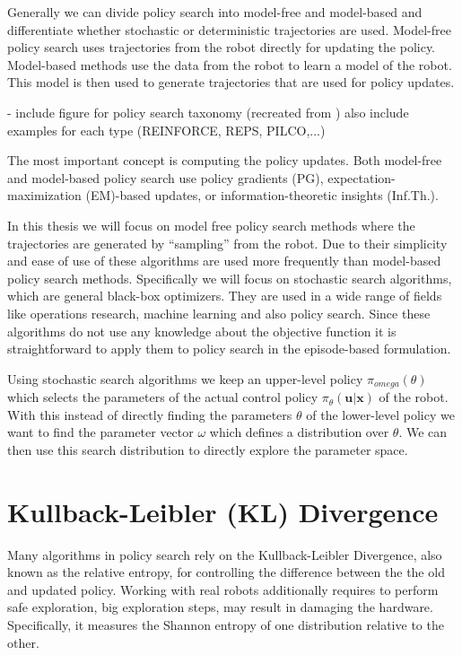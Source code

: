 Generally we can divide policy search into model-free and model-based and
differentiate whether stochastic or deterministic trajectories are used.
Model-free policy search uses trajectories from the robot directly
for updating the policy. Model-based methods use the data
from the robot to learn a model of the robot. This model is then used
to generate trajectories that are used for policy updates.

- include figure for policy search taxonomy
  (recreated from \citet{deisenroth2013survey})
  also include examples for each type (REINFORCE, REPS, PILCO,...)

The most important concept is computing the policy updates.
Both model-free and model-based policy search use policy gradients (PG),
expectation-maximization (EM)-based updates, or
information-theoretic insights (Inf.Th.).

In this thesis we will focus on model free policy search methods
where the trajectories are generated by ``sampling'' from
the robot.
Due to their simplicity and ease of use of these algorithms
are used more frequently than model-based policy search methods.
Specifically we will focus on stochastic
search algorithms, which are general black-box optimizers.
They are used in a wide range of fields like operations research,
machine learning and also policy search.
Since these algorithms do not use any knowledge about the
objective function it is straightforward to
apply them to policy search in the episode-based formulation.

Using stochastic search algorithms we keep an upper-level policy
$\pi_{omega}(\theta)$ which selects the parameters of the
actual control policy $\pi_{\theta}(\mathbf{u} | \mathbf{x})$ of the robot.
With this instead of directly finding the parameters $\theta$ of the
lower-level policy we want to find the parameter vector $\omega$ which
defines a distribution over $\theta$. We can then use this
search distribution to directly explore the parameter space.


\section{Kullback-Leibler (KL) Divergence}
Many algorithms in policy search rely on the Kullback-Leibler Divergence, also
known as the relative entropy, for controlling
the difference between the the old and updated policy.
Working with real robots additionally requires to perform safe exploration, big
exploration steps, may result in damaging the hardware.
Specifically, it measures the Shannon entropy of one distribution relative to the
other.

